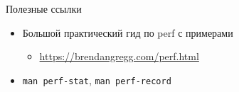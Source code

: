 \documentclass{../../slides-style}
\begin{document}
\begin{frame}{Полезные ссылки}
    \begin{itemize}
        \item Большой практический гид по perf с примерами
              \begin{itemize}
                  \item \url{https://brendangregg.com/perf.html}
              \end{itemize}

        \item \texttt{man perf-stat}, \texttt{man perf-record}
    \end{itemize}
\end{frame}
\end{document}
